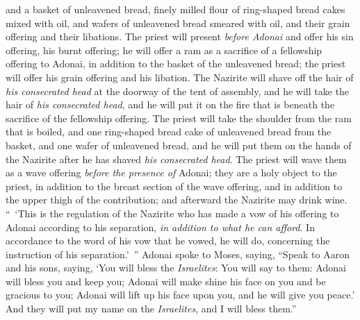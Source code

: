 \begin{biblechapter}
\verse and a basket of unleavened bread, finely milled flour of ring-shaped bread cakes mixed with oil, and wafers of unleavened bread smeared with oil, and their grain offering and their libations.
\verse The priest will present \textit{before Adonai} and offer his sin offering, his burnt offering;
\verse he will offer a ram as a sacrifice of a fellowship offering to Adonai, in addition to the basket of the unleavened bread; the priest will offer his grain offering and his libation.
\verse The Nazirite will shave off the hair of \textit{his consecrated head} at the doorway of the tent of assembly, and he will take the hair of \textit{his consecrated head}, and he will put it on the fire that is beneath the sacrifice of the fellowship offering.
\verse The priest will take the shoulder from the ram that is boiled, and one ring-shaped bread cake of unleavened bread from the basket, and one wafer of unleavened bread, and he will put them on the hands of the Nazirite after he has shaved \textit{his consecrated head}.
\verse The priest will wave them as a wave offering \textit{before the presence of} Adonai; they are a holy object to the priest, in addition to the breast section of the wave offering, and in addition to the upper thigh of the contribution; and afterward the Nazirite may drink wine.
\verse “ ‘This is the regulation of the Nazirite who has made a vow of his offering to Adonai according to his separation, \textit{in addition to what he can afford}. In accordance to the word of his vow that he vowed, he will do, concerning the instruction of his separation.’ ”
 Adonai spoke to Moses, saying,
\verse “Speak to Aaron and his sons, saying, ‘You will bless the \textit{Israelites}: You will say to them:
\verse Adonai will bless you 
and keep you;
\verse Adonai will make shine his face on you 
and be gracious to you;
\verse Adonai will lift up his face upon you, 
and he will give you peace.’
\verse And they will put my name on the \textit{Israelites}, and I will bless them.”
\end{biblechapter}


